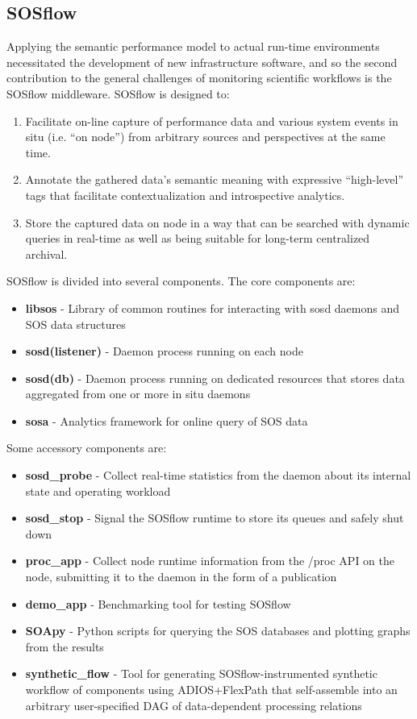 
\subsection{SOSflow}
Applying the semantic performance model to actual
run-time environments necessitated the development of new
infrastructure software, and so the second contribution to the general
challenges of monitoring scientific workflows is the SOSflow middleware.
SOSflow is designed to:

\begin{enumerate}
\item Facilitate on-line capture of performance data and various system
  events in situ (i.e. ``on node'') from arbitrary sources and
  perspectives at the same time.
\item Annotate the gathered data's semantic meaning with expressive
  ``high-level'' tags that facilitate contextualization and
  introspective analytics.
\item Store the captured data on node in a way that can be searched
  with dynamic queries in real-time as well as being suitable for
  long-term centralized archival.
\end{enumerate}

SOSflow is divided into several components.  The core components are:
\begin{itemize}
\item \textbf{libsos} - Library of common routines for interacting with
      sosd daemons and SOS data structures
\item \textbf{sosd(listener)} - Daemon process running on each node
\item \textbf{sosd(db)} - Daemon process running on dedicated resources
      that stores data aggregated from one or more in situ daemons
\item \textbf{sosa} - Analytics framework for online query of SOS data
\end{itemize}

Some accessory components are:
\begin{itemize}
\item \textbf{sosd\_probe} - Collect real-time statistics from the daemon about
      its internal state and operating workload
\item \textbf{sosd\_stop} - Signal the SOSflow runtime to store its queues and
      safely shut down
\item \textbf{proc\_app} - Collect node runtime information from the /proc
      API on the node, submitting it to the daemon in the form of a publication
\item \textbf{demo\_app} - Benchmarking tool for testing SOSflow
\item \textbf{SOApy} - Python scripts for querying the SOS databases and plotting
      graphs from the results
\item \textbf{synthetic\_flow} - Tool for generating SOSflow-instrumented
      synthetic workflow of components using ADIOS+FlexPath
      that self-assemble into an arbitrary  user-specified DAG of
      data-dependent processing relations
\end{itemize}


